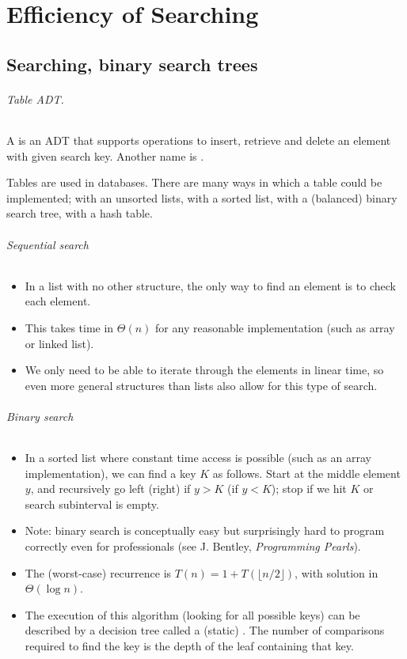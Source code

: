 \part{Efficiency of Searching}  
\label{ch:effsearch}

\chapter{Searching, binary search trees} %

\paragraph{Table ADT.}
\begin{Definition}
A  is an ADT that supports operations to insert, retrieve and delete an element
with given search key.  Another name is .
\end{Definition}
Tables are used in databases. There are  many ways in which a table could be implemented;
with an unsorted lists, with a sorted list, with a (balanced) binary search tree, with a hash table.

\paragraph{Sequential search}
\begin{itemize}
\item In a list with no other structure, the only way to find an element is to 
check each element. 
\item This takes time in $\Theta(n)$ for any reasonable implementation (such as 
array or linked list).
\item We only need to be able to iterate through the elements in linear time, so
 even more general structures than lists also allow for this type of search.
\end{itemize}

\paragraph{Binary search}
\begin{itemize}
\item In a sorted list where constant time access is possible 
(such as an array implementation), we can find a key $K$ as follows. 
Start at the middle element $y$, and recursively go left (right) if $y>K$ (if $y<K$);
 stop if we hit  $K$ or search subinterval is empty.
\item Note: binary search is conceptually easy but surprisingly hard to program
 correctly even for professionals (see J. Bentley, \emph{Programming Pearls}).
\item The (worst-case) recurrence is $T(n) = 1 +  T(\lfloor n/2 \rfloor)$, with 
solution in $\Theta(\log n)$.
\item The execution of this algorithm (looking for all possible keys) can be 
described by a decision tree called a (static) . The 
number of comparisons required to find the key is the depth of the leaf 
containing that key.
\end{itemize}

